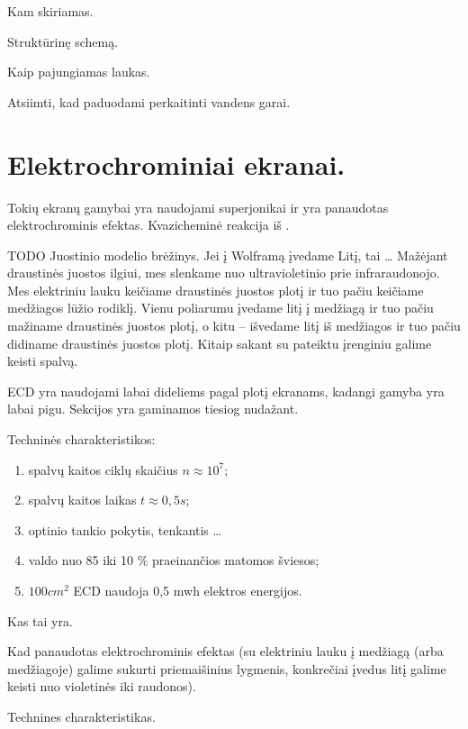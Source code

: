 \begin{remember}
  \item Kam skiriamas.
  \item Struktūrinę schemą.
  \item Kaip pajungiamas laukas.
  \item Atsiimti, kad paduodami perkaitinti vandens garai.
\end{remember}

\section{Elektrochrominiai ekranai.}

Tokių ekranų gamybai yra naudojami superjonikai ir yra panaudotas
elektrochrominis efektas. Kvazicheminė reakcija iš .

TODO Juostinio modelio brėžinys.
Jei į Wolframą įvedame Litį, tai … Mažėjant draustinės juostos ilgiui,
mes slenkame nuo ultravioletinio prie infraraudonojo. Mes elektriniu
lauku keičiame draustinės juostos plotį ir tuo pačiu keičiame medžiagos
lūžio rodiklį. Vienu poliarumu įvedame litį į medžiagą ir tuo pačiu
mažiname draustinės juostos plotį, o kitu – išvedame litį iš medžiagos
ir tuo pačiu didiname draustinės juostos plotį. Kitaip sakant
su  pateiktu įrenginiu galime keisti spalvą.

ECD yra naudojami labai dideliems pagal plotį ekranams, kadangi
gamyba yra labai pigu. Sekcijos yra gaminamos tiesiog nudažant.

Techninės charakteristikos:
\begin{enumerate}
  \item spalvų kaitos ciklų skaičius $n\approx 10^{7}$;
  \item spalvų kaitos laikas $t \approx 0,5 s$;
  \item optinio tankio pokytis, tenkantis …
  \item valdo nuo 85 iki 10 \% praeinančios matomos šviesos;
  \item $100 cm^{2}$ ECD naudoja 0,5 mwh elektros energijos.
\end{enumerate}

\begin{remember}
  \item Kas tai yra.
  \item Kad panaudotas elektrochrominis efektas (su elektriniu lauku
    į medžiagą (arba medžiagoje) galime sukurti priemaišinius
    lygmenis, konkrečiai įvedus litį galime keisti nuo violetinės iki
    raudonos).
\item Technines charakteristikas.
\end{remember}

